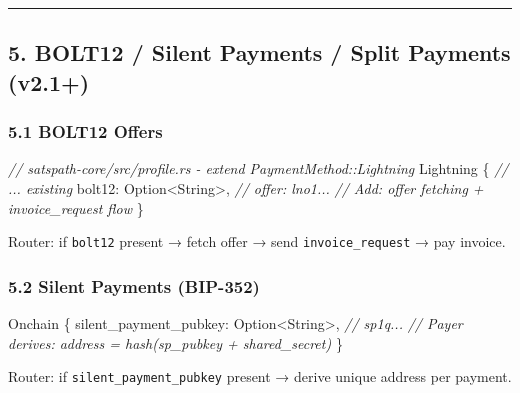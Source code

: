 \documentclass[
]{article}
\newenvironment{Shaded}{}{}
\newcommand{\CommentTok}[1]{\textcolor[rgb]{0.38,0.63,0.69}{\textit{#1}}}
\newcommand{\DataTypeTok}[1]{\textcolor[rgb]{0.56,0.13,0.00}{#1}}
\newcommand{\NormalTok}[1]{#1}
\newcommand{\OperatorTok}[1]{\textcolor[rgb]{0.40,0.40,0.40}{#1}}
\begin{document}
\begin{center}\rule{0.5\linewidth}{0.5pt}\end{center}

\hypertarget{bolt12-silent-payments-split-payments-v2.1}{%
\subsection{5. BOLT12 / Silent Payments / Split Payments
(v2.1+)}\label{bolt12-silent-payments-split-payments-v2.1}}

\hypertarget{bolt12-offers}{%
\subsubsection{5.1 BOLT12 Offers}\label{bolt12-offers}}

\begin{Shaded}
\begin{Highlighting}[]
\CommentTok{// satspath{-}core/src/profile.rs {-} extend PaymentMethod::Lightning}
\NormalTok{Lightning }\OperatorTok{\{}
    \CommentTok{// ... existing}
\NormalTok{    bolt12}\OperatorTok{:} \DataTypeTok{Option}\OperatorTok{\textless{}}\DataTypeTok{String}\OperatorTok{\textgreater{},}  \CommentTok{// offer: lno1...}
    \CommentTok{// Add: offer fetching + invoice\_request flow}
\OperatorTok{\}}
\end{Highlighting}
\end{Shaded}

Router: if \texttt{bolt12} present → fetch offer → send
\texttt{invoice\_request} → pay invoice.

\hypertarget{silent-payments-bip-352}{%
\subsubsection{5.2 Silent Payments
(BIP-352)}\label{silent-payments-bip-352}}

\begin{Shaded}
\begin{Highlighting}[]
\NormalTok{Onchain }\OperatorTok{\{}
\NormalTok{    silent\_payment\_pubkey}\OperatorTok{:} \DataTypeTok{Option}\OperatorTok{\textless{}}\DataTypeTok{String}\OperatorTok{\textgreater{},}  \CommentTok{// sp1q...}
    \CommentTok{// Payer derives: address = hash(sp\_pubkey + shared\_secret)}
\OperatorTok{\}}
\end{Highlighting}
\end{Shaded}

Router: if \texttt{silent\_payment\_pubkey} present → derive unique
address per payment.
\end{document}
